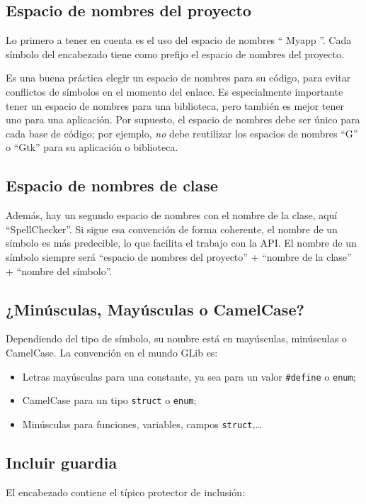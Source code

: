 \subsection{Espacio de nombres del proyecto}
Lo primero a tener en cuenta es el uso del espacio de nombres `` Myapp ''. Cada símbolo del encabezado tiene como prefijo el espacio de nombres del proyecto.

Es una buena práctica elegir un espacio de nombres para su código, para evitar conflictos de símbolos en el momento del enlace. Es especialmente importante tener un espacio de nombres para una biblioteca, pero también es mejor tener uno para una aplicación. Por supuesto, el espacio de nombres debe ser único para cada base de código; por ejemplo, \emph{no} debe reutilizar los espacios de nombres ``G'' o ``Gtk'' para su aplicación o biblioteca.

\subsection{Espacio de nombres de clase}
Además, hay un segundo espacio de nombres con el nombre de la clase, aquí ``SpellChecker''. Si sigue esa convención de forma coherente, el nombre de un símbolo es más predecible, lo que facilita el trabajo con la API. El nombre de un símbolo siempre será ``espacio de nombres del proyecto'' + ``nombre de la clase'' + ``nombre del símbolo''.

\subsection{¿Minúsculas, Mayúsculas o CamelCase?}
Dependiendo del tipo de símbolo, su nombre está en mayúsculas, minúsculas o CamelCase. La convención en el mundo GLib es:
\begin{itemize}
    \item Letras mayúsculas para una constante, ya sea para un valor \lstinline{#define} o \lstinline{enum};
    \item CamelCase para un tipo \lstinline{struct} o \lstinline{enum};
    \item Minúsculas para funciones, variables, campos \lstinline{struct},…
\end{itemize}

\subsection{Incluir guardia}
El encabezado contiene el típico protector de inclusión:

